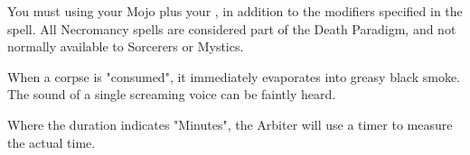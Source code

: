 {You must \RO using your Mojo \UD plus your \FOC, in addition to the modifiers specified in the spell.  All Necromancy spells are considered part of the Death Paradigm, and not normally available to Sorcerers or Mystics.




When a corpse is "consumed", it immediately evaporates into greasy black smoke.  The sound of a single screaming voice can be faintly heard.

Where the duration indicates "\LVL Minutes", the Arbiter will use a timer to measure the actual time.



\newpage



} %
